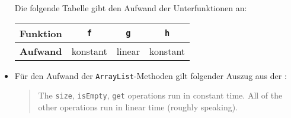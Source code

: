 \documentclass[german]{acAssignment}
\begin{document}
\begin{itemize}[itemsep=0.4cm]
        Die folgende Tabelle gibt den Aufwand der Unterfunktionen an:
        \begin{center}
            \begin{tabular}{cccc}
                \toprule
                \textbf{Funktion} & \texttt{f} & \texttt{g} & \texttt{h} \\
                \midrule
                \textbf{Aufwand} & konstant & linear & konstant \\
                \bottomrule
            \end{tabular}
        \end{center}
    
    \clearpage
    \item
        \begin{myAlgTable}{4}
            \myAlgTableRow{}{\ \ \ \ \}}
            \myAlgTableRow{}{\ \ \}}
            \myAlgTableRow{}{\}}
        \end{myAlgTable}
        
        Für den Aufwand der \texttt{ArrayList}-Methoden gilt folgender Auszug aus
        der :
        \begin{quote}
            The \texttt{size}, \texttt{isEmpty}, \texttt{get} \textelp{} operations run in constant time.
            \textelp{} All of the other operations run in linear time (roughly speaking).
        \end{quote}
    

\end{itemize}
\end{document}
